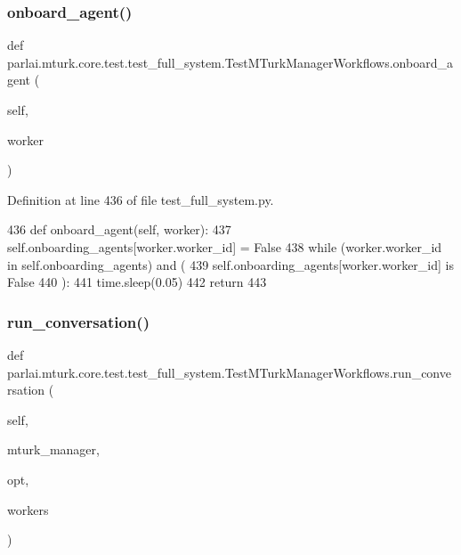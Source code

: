 \subsubsection{\texorpdfstring{onboard\+\_\+agent()}{onboard\_agent()}}
{\footnotesize\ttfamily def parlai.\+mturk.\+core.\+test.\+test\+\_\+full\+\_\+system.\+Test\+M\+Turk\+Manager\+Workflows.\+onboard\+\_\+agent (\begin{DoxyParamCaption}\item[{}]{self,  }\item[{}]{worker }\end{DoxyParamCaption})}



Definition at line 436 of file test\+\_\+full\+\_\+system.\+py.


\begin{DoxyCode}
436     \textcolor{keyword}{def }onboard\_agent(self, worker):
437         self.onboarding\_agents[worker.worker\_id] = \textcolor{keyword}{False}
438         \textcolor{keywordflow}{while} (worker.worker\_id \textcolor{keywordflow}{in} self.onboarding\_agents) \textcolor{keywordflow}{and} (
439             self.onboarding\_agents[worker.worker\_id] \textcolor{keywordflow}{is} \textcolor{keyword}{False}
440         ):
441             time.sleep(0.05)
442         \textcolor{keywordflow}{return}
443 
\end{DoxyCode}
\mbox{\label{classparlai_1_1mturk_1_1core_1_1test_1_1test__full__system_1_1TestMTurkManagerWorkflows_abe32bc53e3e76d2db1bf52045fa15707}} 
\subsubsection{\texorpdfstring{run\+\_\+conversation()}{run\_conversation()}}
{\footnotesize\ttfamily def parlai.\+mturk.\+core.\+test.\+test\+\_\+full\+\_\+system.\+Test\+M\+Turk\+Manager\+Workflows.\+run\+\_\+conversation (\begin{DoxyParamCaption}\item[{}]{self,  }\item[{}]{mturk\+\_\+manager,  }\item[{}]{opt,  }\item[{}]{workers }\end{DoxyParamCaption})}



